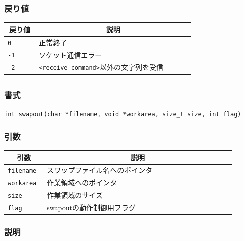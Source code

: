 \documentclass[twoside,11pt,fleqn]{book}
\begin{document}
\subsubsection*{戻り値}{\quad}
\begin{table}[!h]
\footnotesize
\begin{tabular}{|p{0.15\linewidth}|p{0.75\linewidth}|} \hline
\multicolumn{1}{|c}{\textbf{戻り値}}&\multicolumn{1}{|c|}{\textbf{説明}}\\ \hline \hline
\texttt{0}&正常終了\\ \hline
\texttt{-1}&ソケット通信エラー\\ \hline
\texttt{-2}&\texttt{<receive\_command>}以外の文字列を受信\\ \hline
\end{tabular}
\vspace{-0em}
\end{table}
\FloatBarrier

\subsection{}
\subsubsection*{書式}{\quad} \texttt{int swapout(char *filename, void *workarea, size\_t size, int flag)}
\subsubsection*{引数}{\quad}
\begin{table}[!ht]
\footnotesize
\begin{tabular}{|p{0.15\linewidth}|p{0.75\linewidth}|} \hline
\multicolumn{1}{|c}{\textbf{引数}}&\multicolumn{1}{|c|}{\textbf{説明}}\\ \hline \hline
\texttt{filename}&スワップファイル名へのポインタ\\ \hline
\texttt{workarea}&作業領域へのポインタ\\ \hline
\texttt{size}&作業領域のサイズ\\ \hline
\texttt{flag}&swapoutの動作制御用フラグ \\ \hline
\end{tabular}
\vspace{-0em}
\end{table}

\subsubsection*{説明}{\quad}
\end{document}
